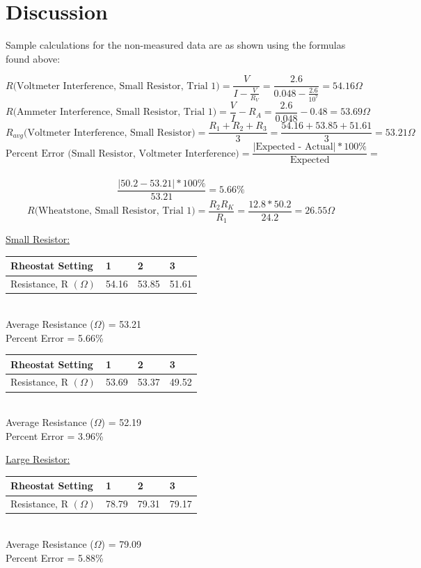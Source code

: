 \documentclass[11pt, titlepage]{article}
\begin{document}
\section*{Discussion}
Sample calculations for the non-measured data are as shown using the formulas found above:

$$R \text{(Voltmeter Interference, Small Resistor, Trial 1)} = \frac{V}{I - \frac{V}{R_V}} = \frac{2.6}{0.048 - \frac{2.6}{10^7}} = 54.16 \Omega$$
$$R \text{(Ammeter Interference, Small Resistor, Trial 1)} = \frac{V}{I} - R_A = \frac{2.6}{0.048} - 0.48 = 53.69 \Omega$$
$$R_{avg} \text{(Voltmeter Interference, Small Resistor)} = \frac{R_1 + R_2 + R_3}{3} = \frac{54.16 + 53.85 + 51.61}{3} = 53.21 \Omega$$
$$\text{Percent Error (Small Resistor, Voltmeter Interference)} = \frac{\text{$|$Expected - Actual$|$} * 100\%}{\text{Expected}} =$$\\$$\frac{|50.2 - 53.21| * 100\%}{53.21} = 5.66\%$$
$$R \text{(Wheatstone, Small Resistor, Trial 1)} = \frac{R_2R_K}{R_1} = \frac{12.8*50.2}{24.2} = 26.55 \Omega$$

\underline{Small Resistor:}
\begin{center}
\begin{tabular}
{|m{9em}|m{7em}|m{7em}|m{7em}|}
\hline
Rheostat Setting & 1 & 2 & 3 \\
\hline
Resistance, R $(\Omega)$ & 54.16 & 53.85 & 51.61\\
\hline
\end{tabular}
\\Average Resistance ($\Omega$) = 53.21
\\Percent Error = 5.66\%
\end{center}

\begin{center}
\begin{tabular}
{|m{9em}|m{7em}|m{7em}|m{7em}|}
\hline
Rheostat Setting & 1 & 2 & 3 \\
\hline
Resistance, R $(\Omega)$ & 53.69 & 53.37 & 49.52\\
\hline
\end{tabular}
\\Average Resistance ($\Omega$) = 52.19
\\Percent Error = 3.96\%
\end{center}

\underline{Large Resistor:}
\begin{center}
\begin{tabular}
{|m{9em}|m{7em}|m{7em}|m{7em}|}
\hline
Rheostat Setting & 1 & 2 & 3 \\
\hline
Resistance, R $(\Omega)$ & 78.79 & 79.31 & 79.17\\
\hline
\end{tabular}
\\Average Resistance ($\Omega$) = 79.09
\\Percent Error = 5.88\%
\end{center}
\end{document}
